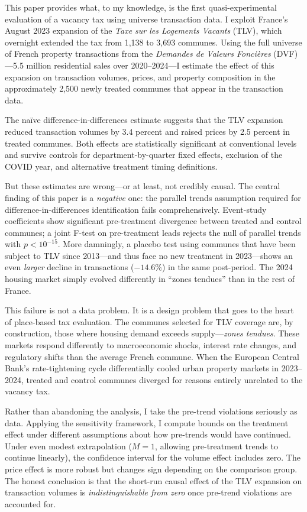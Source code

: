 \documentclass[12pt]{article}
\begin{document}
This paper provides what, to my knowledge, is the first quasi-experimental evaluation of a vacancy tax using universe transaction data. I exploit France's August 2023 expansion of the \textit{Taxe sur les Logements Vacants} (TLV), which overnight extended the tax from 1,138 to 3,693 communes. Using the full universe of French property transactions from the \textit{Demandes de Valeurs Fonci\`eres} (DVF)---5.5 million residential sales over 2020--2024---I estimate the effect of this expansion on transaction volumes, prices, and property composition in the approximately 2,500 newly treated communes that appear in the transaction data.

The na\"ive difference-in-differences estimate suggests that the TLV expansion reduced transaction volumes by 3.4 percent and raised prices by 2.5 percent in treated communes. Both effects are statistically significant at conventional levels and survive controls for department-by-quarter fixed effects, exclusion of the COVID year, and alternative treatment timing definitions.

But these estimates are wrong---or at least, not credibly causal. The central finding of this paper is a \textit{negative} one: the parallel trends assumption required for difference-in-differences identification fails comprehensively. Event-study coefficients show significant pre-treatment divergence between treated and control communes; a joint F-test on pre-treatment leads rejects the null of parallel trends with $p < 10^{-15}$. More damningly, a placebo test using communes that have been subject to TLV since 2013---and thus face no new treatment in 2023---shows an even \textit{larger} decline in transactions ($-14.6\%$) in the same post-period. The 2024 housing market simply evolved differently in ``zones tendues'' than in the rest of France.

This failure is not a data problem. It is a design problem that goes to the heart of place-based tax evaluation. The communes selected for TLV coverage are, by construction, those where housing demand exceeds supply---\textit{zones tendues}. These markets respond differently to macroeconomic shocks, interest rate changes, and regulatory shifts than the average French commune. When the European Central Bank's rate-tightening cycle differentially cooled urban property markets in 2023--2024, treated and control communes diverged for reasons entirely unrelated to the vacancy tax.

Rather than abandoning the analysis, I take the pre-trend violations seriously as data. Applying the \citet{rambachan2023more} sensitivity framework, I compute bounds on the treatment effect under different assumptions about how pre-trends would have continued. Under even modest extrapolation ($M = 1$, allowing pre-treatment trends to continue linearly), the confidence interval for the volume effect includes zero. The price effect is more robust but changes sign depending on the comparison group. The honest conclusion is that the short-run causal effect of the TLV expansion on transaction volumes is \textit{indistinguishable from zero} once pre-trend violations are accounted for.
\end{document}
